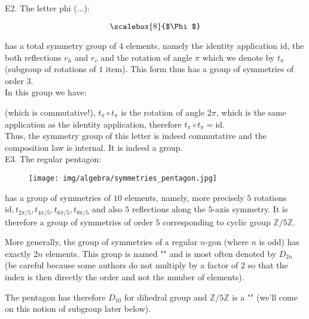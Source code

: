	\pagebreak
	\begin{tcolorbox}[colframe=black,colback=white,sharp corners]
	E2. The letter phi (...):
	\begin{center}
	\[ \scalebox{8}{$\Phi$} \]
	\end{center}
	has a total symmetry group of $4$ elements, namely the identity application $\text{id}$, the both reflections $r_h$ and $r_v$ and the rotation of angle $\pi$ which we denote by $t_\pi$ (subgroup of rotations of $1$ item). This form thus has a group of symmetries of order $3$.\\
	
	In this group we have:
	
 	(which is commutative!), $t_{\pi}\circ t_{\pi}$ is the rotation of angle $2\pi$, which is the same application as the identity application, therefore $t_{\pi}\circ t_\pi=\text{id}$.\\
 	
 	Thus, the symmetry group of this letter is indeed commutative and the composition law is internal. It is indeed a group.\\
 	
 	E3. The regular pentagon:
 	\begin{figure}[H]
		\centering
		\texttt{[image: img/algebra/symmetries\_pentagon.jpg]}
	\end{figure}
	has a group of symmetries of $10$ elements, namely, more precisely  $5$ rotations $\text{id},t_{2\pi/5},t_{4\pi/5},t_{6\pi/5},t_{8\pi/5}$ and also $5$ reflections along the $5$-axis symmetry. It is therefore a group of symmetries of order $5$ corresponding to cyclic group $\mathbb{Z}/ 5\mathbb{Z}$.\\
	
	\begin{tcolorbox}[title=Remark,colframe=black,arc=10pt]
More generally, the group of symmetries of a regular $n$-gon (where $n$ is odd) has exactly $2n$ elements. This group is named "" and is most often denoted by $D_{2n}$ (be careful because some authors do not multiply by a factor of $2$ so that the index is then directly the order and not the number of elements).
	\end{tcolorbox}	
	The pentagon has therefore $D_{10}$ for dihedral group and $\mathbb{Z}/ 5\mathbb{Z}$ is a "" (we'll come on this notion of subgroup later below).
	\end{tcolorbox}
	
